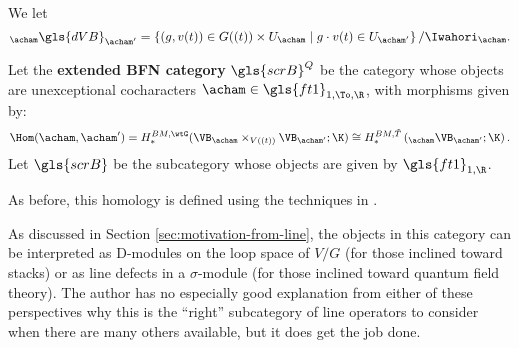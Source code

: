 We let
\begin{equation}
{}_{\acham}\gls{dVB}_{\acham'}=\left\{(g,v(t))\in G((t))\times
        U_{\acham}\mid g\cdot v(t)\in
        U_{\acham'}\right\}/\Iwahori_{\acham}.\label{eq:aXa}
    \end{equation}
\begin{definition}\label{def:extended-BFN}
  Let the {\bf extended BFN category} $\gls{scrB}^Q$ be the category whose
  objects are unexceptional cocharacters $\acham\in  \gls{ft1}_{1,
  \To,\R}$, with morphisms given by:
  \begin{equation*}
    \Hom(\acham,\acham')=H_*^{BM, \wtG}(\VB_{\acham}\times_{V((t))}\VB_{\acham'};\K)\\
    \cong H_*^{BM, \tilde T}\left({}_{\acham}\VB_{\acham'};
    \K\right).
\end{equation*}
Let $\gls{scrB}$ be the subcategory whose objects are given by $\gls{ft1}_{1,\R}$.
\end{definition}
As before, this homology is defined using the techniques in \cite[\S
2(ii)]{BFN}.
\begin{physics}
  As discussed in Section \ref{sec:motivation-from-line}, the objects
  in this category can be interpreted as D-modules on the loop space
  of $V/G$ (for those inclined toward stacks) or as line defects in a
  $\sigma$-module (for those inclined toward quantum field theory).
  The author has no especially good explanation from either of these
  perspectives why this is the ``right'' subcategory of line operators
  to consider when there are many others available, but it does get the job done.
\end{physics}


